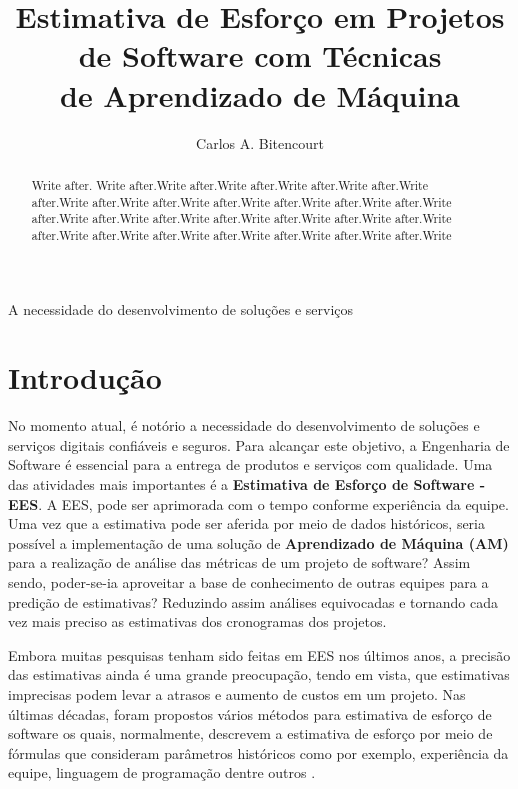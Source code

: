 \documentclass[12pt]{article}
\title{Estimativa de Esforço em Projetos de Software com Técnicas\\ de Aprendizado de Máquina}
\author{Carlos A. Bitencourt\inst{1}}
\begin{document}
\maketitle

\begin{abstract}
  Write after. Write after.Write after.Write after.Write after.Write after.Write after.Write after.Write after.Write after.Write after.Write after.Write after.Write after.Write after.Write after.Write after.Write after.Write after.Write after.Write after.Write after.Write after.Write after.Write after.Write after.Write after.Write
\end{abstract}

\begin{resumo}
  A necessidade do desenvolvimento de soluções e serviços 

\end{resumo}

\section{Introdução}

No momento atual, é notório a necessidade do desenvolvimento de soluções e serviços digitais confiáveis e seguros. Para alcançar este objetivo, a Engenharia de Software é essencial para a entrega de produtos e serviços com qualidade. Uma das atividades mais importantes é a \textbf{Estimativa de Esforço de Software - EES}. A EES, pode ser aprimorada com o tempo conforme experiência da equipe. Uma vez que a estimativa pode ser aferida por meio de dados históricos, seria possível a implementação de uma solução de \textbf{Aprendizado de Máquina (AM)} para a realização de análise das métricas de um projeto de software? Assim sendo, poder-se-ia aproveitar a base de conhecimento de outras equipes para a predição de estimativas? Reduzindo assim análises equivocadas e tornando cada vez mais preciso as estimativas dos cronogramas dos projetos.

Embora muitas pesquisas tenham sido feitas em EES nos últimos anos, a precisão das estimativas  ainda é uma grande preocupação, tendo em vista, que estimativas imprecisas podem levar a atrasos e aumento de custos em um projeto. Nas últimas décadas, foram propostos vários métodos para estimativa de esforço de software os quais, normalmente, descrevem a estimativa de esforço por meio de fórmulas que consideram parâmetros históricos como por exemplo, experiência da equipe, linguagem de programação dentre outros \cite{asadegravino:2019}.
\end{document}
